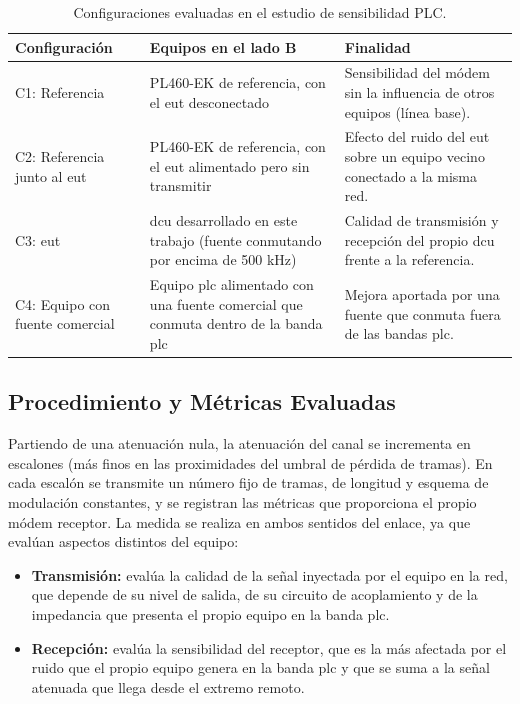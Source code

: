 \begin{table}[!h]
\centering
\small
\begin{tabular}{|p{3.2cm}|p{5.4cm}|p{5.6cm}|}
\hline
\textbf{Configuración} & \textbf{Equipos en el lado B} & \textbf{Finalidad} \\ \hline
C1: Referencia & PL460-EK de referencia, con el \gls{eut} desconectado & Sensibilidad del módem sin la influencia de otros equipos (línea base). \\ \hline
C2: Referencia junto al \gls{eut} & PL460-EK de referencia, con el \gls{eut} alimentado pero sin transmitir & Efecto del ruido del \gls{eut} sobre un equipo vecino conectado a la misma red. \\ \hline
C3: \gls{eut} & \gls{dcu} desarrollado en este trabajo (fuente conmutando por encima de 500 kHz) & Calidad de transmisión y recepción del propio \gls{dcu} frente a la referencia. \\ \hline
C4: Equipo con fuente comercial & Equipo \gls{plc} alimentado con una fuente comercial que conmuta dentro de la banda \gls{plc} & Mejora aportada por una fuente que conmuta fuera de las bandas \gls{plc}. \\ \hline
\end{tabular}
\caption{Configuraciones evaluadas en el estudio de sensibilidad PLC.}
\label{tab:configuraciones_sensibilidad}
\end{table}

\subsection{Procedimiento y Métricas Evaluadas}
\label{subsec:procedimiento_sensibilidad}

Partiendo de una atenuación nula, la atenuación del canal se incrementa en escalones (más finos en las proximidades del umbral de pérdida de tramas). En cada escalón se transmite un número fijo de tramas, de longitud y esquema de modulación constantes, y se registran las métricas que proporciona el propio módem receptor. La medida se realiza en ambos sentidos del enlace, ya que evalúan aspectos distintos del equipo:

\begin{itemize}
    \item \textbf{Transmisión:} evalúa la calidad de la señal inyectada por el equipo en la red, que depende de su nivel de salida, de su circuito de acoplamiento y de la impedancia que presenta el propio equipo en la banda \gls{plc}.
    \item \textbf{Recepción:} evalúa la sensibilidad del receptor, que es la más afectada por el ruido que el propio equipo genera en la banda \gls{plc} y que se suma a la señal atenuada que llega desde el extremo remoto.
\end{itemize}

